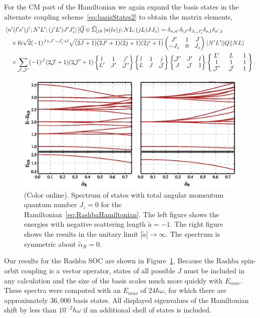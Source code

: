 \documentclass[%
 notitlepage,
 preprint,
showpacs,%
 amsmath,amssymb,
 aps,
pra,
]{revtex4-1}
\newcommand{\threej}[6]{ \begin{pmatrix}
  #1 & #2 & #3 \\
  #4 & #5 & #6 
 \end{pmatrix}}
\newcommand{\sixj}[6]{ \begin{Bmatrix}
  #1 & #2 & #3 \\
  #4 & #5 & #6 
 \end{Bmatrix}}
\newcommand{\ninej}[9]{ \begin{Bmatrix}
  #1 & #2 & #3 \\
  #4 & #5 & #6 \\
  #7 & #8 & #9
 \end{Bmatrix}}
\begin{document}
For the CM part of the Hamiltonian we again expand the basis states in the alternate coupling scheme~\eqref{eq:basisStates2} to obtain the matrix elements,
\begin{equation}\begin{split}
&\bra{n'(l's')j';N'L';(j'L')J'J'_z} [ \vec{Q} \otimes \vec{\Sigma} ]_{10}  \ket{n(ls)j;NL;(jL)JJ_z} = \delta_{n,n'}\delta_{l,l'}\delta_{J_z,J'_z}\delta_{s,1}\delta_{s',1} \\
 &\quad\times 6 i \sqrt{2}(-1)^{J+J'-J'_z+l} \sqrt{(2J+1)(2J'+1)(2j+1)(2j'+1)} \threej{J'}{1}{J}{-J_z}{0}{J_z}  \braket{N' L' || Q || N L} \\ 
 &\quad\times\sum_{\mathcal{J},\mathcal{J}'} (-1)^\mathcal{J}(2\mathcal{J}+1)(2\mathcal{J}'+1)\sixj{l}{1}{j'}{L'}{J'}{\mathcal{J}'}\sixj{l}{1}{j}{L}{J}{\mathcal{J}}\sixj{\mathcal{J}'}{J'}{l}{J}{\mathcal{J}}{1}
 \renewcommand{\arraystretch}{0.9}
 \ninej{\hphantom{l}L'\hphantom{l}}{\hphantom{l}L\hphantom{l}}{\hphantom{l}1\hphantom{l}}{1}{1}{1}{\mathcal{J}'}{\mathcal{J}}{1} .
\end{split}
\end{equation}

\begin{figure}
\includegraphics{Figures/RashbaSpectrum}
\caption{\label{fig:RashbaSpectrum}(Color online).  Spectrum of states with total angular momentum quantum number $J_z=0$ for the Hamiltonian~\eqref{eq:RashbaHamiltonian}. The left figure shows the energies with negative scattering length $\tilde{a}=-1$. The right figure shows the results in the unitary limit $|\tilde{a}|\rightarrow\infty$. The spectrum is symmetric about $\tilde{\alpha}_R=0$.} 
\end{figure}


Our results for the Rashba SOC are shown in Figure~\ref{fig:RashbaSpectrum}. Because the Rashba spin-orbit coupling is a vector operator, states of all possible $J$ must be included in any calculation and the size of the basis scales much more quickly with $E_{max}$. These spectra were computed with an $E_{max}$ of $24\hbar\omega$, for which there are approximately $36,000$ basis states. All displayed eigenvalues of the Hamiltonian shift by less than $10^{-2}\hbar\omega$ if an additional shell of states is included.
\end{document}
